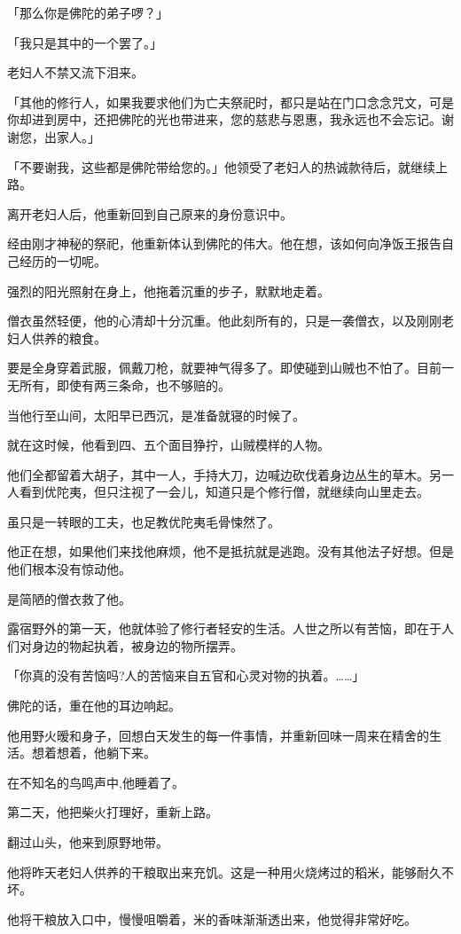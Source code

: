 \documentclass[twoside,openany]{book}
\begin{document}
「那么你是佛陀的弟子啰？」

「我只是其中的一个罢了。」

老妇人不禁又流下泪来。

「其他的修行人，如果我要求他们为亡夫祭祀时，都只是站在门口念念咒文，可是你却进到房中，还把佛陀的光也带进来，您的慈悲与恩惠，我永远也不会忘记。谢谢您，出家人。」

「不要谢我，这些都是佛陀带给您的。」他领受了老妇人的热诚款待后，就继续上路。

离开老妇人后，他重新回到自己原来的身份意识中。

经由刚才神秘的祭祀，他重新体认到佛陀的伟大。他在想，该如何向净饭王报告自己经历的一切呢。

强烈的阳光照射在身上，他拖着沉重的步子，默默地走着。

僧衣虽然轻便，他的心清却十分沉重。他此刻所有的，只是一袭僧衣，以及刚刚老妇人供养的粮食。

要是全身穿着武服，佩戴刀枪，就要神气得多了。即使碰到山贼也不怕了。目前一无所有，即使有两三条命，也不够赔的。

当他行至山间，太阳早已西沉，是准备就寝的时候了。

就在这时候，他看到四、五个面目狰拧，山贼模样的人物。

他们全都留着大胡子，其中一人，手持大刀，边喊边砍伐着身边丛生的草木。另一人看到优陀夷，但只注视了一会儿，知道只是个修行僧，就继续向山里走去。

虽只是一转眼的工夫，也足教优陀夷毛骨悚然了。

他正在想，如果他们来找他麻烦，他不是抵抗就是逃跑。没有其他法子好想。但是他们根本没有惊动他。

是简陋的僧衣救了他。

露宿野外的第一天，他就体验了修行者轻安的生活。人世之所以有苦恼，即在于人们对身边的物起执着，被身边的物所摆弄。

「你真的没有苦恼吗?人的苦恼来自五官和心灵对物的执着。……」

佛陀的话，重在他的耳边响起。

他用野火暧和身子，回想白天发生的每一件事情，并重新回味一周来在精舍的生活。想着想着，他躺下来。

在不知名的鸟鸣声中,他睡着了。

第二天，他把柴火打理好，重新上路。

翻过山头，他来到原野地带。

他将昨天老妇人供养的干粮取出来充饥。这是一种用火烧烤过的稻米，能够耐久不坏。

他将干粮放入口中，慢慢咀嚼着，米的香味渐渐透出来，他觉得非常好吃。
\end{document}
